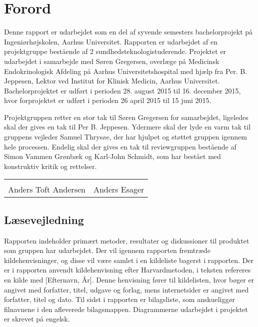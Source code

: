 \chapter*{Forord}

Denne rapport er udarbejdet som en del af syvende semesters bachelorprojekt på Ingeniørhøjskolen, Aarhus Universitet. Rapporten er udarbejdet af en projektgruppe bestående af 2 sundhedsteknologistuderende. Projektet er udarbejdet i samarbejde med Søren Gregersen, overlæge på Medicinsk Endokrinologisk Afdeling på Aarhus Universitetshospital med hjælp fra Per. B. Jeppesen, Lektor ved Institut for Klinisk Medicin, Aarhus Universitet. Bachelorprojektet er udført i perioden 28. august 2015 til 16. december 2015, hvor forprojektet er udført i perioden 26 april 2015 til 15 juni 2015.  

Projektgruppen retter en stor tak til Søren Gregersen for samarbejdet, ligeledes skal der gives en tak til Per B. Jeppesen. Ydermere skal der lyde en varm tak til gruppens vejleder Samuel Thrysøe, der har hjulpet og støttet gruppen igennem hele processen. Endelig skal der gives en tak til reviewgruppen bestående af Simon Vammen Grønbæk og Karl-John Schmidt, som har bestået med konstruktiv kritik og rettelser. 






\phantom{Luft}

\phantom{Luft}

\begin{table}[H]
	\centering
		\begin{tabular}{c c}
			\underline{\phantom{mmmmmmmmmmmmmm}} & \underline{\phantom{mmmmmmmmmmmmmm}}  \\
			Anders Toft Andersen			& Anders Esager		 			\\ 										\end{tabular}
\end{table}

\section*{Læsevejledning}
Rapporten indeholder primært metoder, resultater og diskussioner til produktet som gruppen har udarbejdet. Der vil igennem rapporten fremtræde kildehenvisninger, og disse vil være samlet i en kildeliste bagerst i rapporten. Der er i rapporten anvendt kildehenvisning efter Harvardmetoden, i teksten refereres en kilde med [Efternavn, År]. Denne henvisning fører til kildelisten, hvor bøger er angivet med forfatter, titel, udgave og forlag, mens internetsider er angivet med forfatter, titel og dato. Til sidst i rapporten er bilagsliste, som anskueliggør filnavnene i den afleverede bilagsmappen. Diagrammerne udarbejdet i projektet er skrevet på engelsk. 

